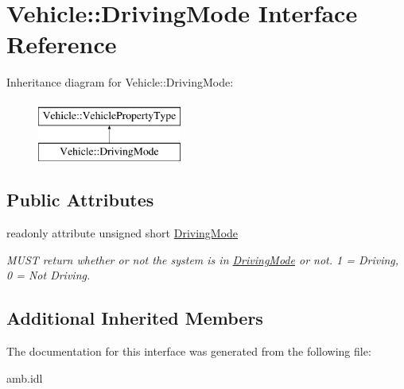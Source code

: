 \hypertarget{interfaceVehicle_1_1DrivingMode}{\section{Vehicle\-:\-:Driving\-Mode Interface Reference}
\label{interfaceVehicle_1_1DrivingMode}
}
Inheritance diagram for Vehicle\-:\-:Driving\-Mode\-:\begin{figure}[H]
\begin{center}
\leavevmode
\includegraphics[height=2.000000cm]{interfaceVehicle_1_1DrivingMode}
\end{center}
\end{figure}
\subsection*{Public Attributes}
\begin{DoxyCompactItemize}
\item 
\hypertarget{interfaceVehicle_1_1DrivingMode_aaeb13f301cbbec784136437a0c20518f}{readonly attribute unsigned short \hyperlink{interfaceVehicle_1_1DrivingMode_aaeb13f301cbbec784136437a0c20518f}{Driving\-Mode}}\label{interfaceVehicle_1_1DrivingMode_aaeb13f301cbbec784136437a0c20518f}

\begin{DoxyCompactList}\small\item\em M\-U\-S\-T return whether or not the system is in \hyperlink{interfaceVehicle_1_1DrivingMode}{Driving\-Mode} or not. 1 = Driving, 0 = Not Driving. \end{DoxyCompactList}\end{DoxyCompactItemize}
\subsection*{Additional Inherited Members}


The documentation for this interface was generated from the following file\-:\begin{DoxyCompactItemize}
\item 
amb.\-idl\end{DoxyCompactItemize}
